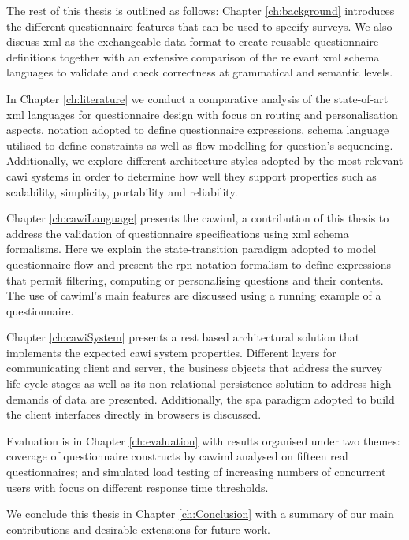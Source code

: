 	The rest of this thesis is outlined as follows: Chapter \ref{ch:background} introduces the different questionnaire features that can be used to specify surveys. We also discuss \gls{xml} as the exchangeable data format to create reusable questionnaire definitions together with an extensive comparison of the relevant \gls{xml} schema languages to validate and check correctness at grammatical and semantic levels.

	In Chapter \ref{ch:literature} we conduct a comparative analysis of the state-of-art \gls{xml} languages for questionnaire design with focus on routing and personalisation aspects, notation adopted to define questionnaire expressions, schema language utilised to define constraints as well as flow modelling for question's sequencing. Additionally, we explore different architecture styles adopted by the most relevant \gls{cawi} systems in order to determine how well they support properties such as scalability, simplicity, portability and reliability.

	Chapter \ref{ch:cawiLanguage} presents the \gls{cawiml}, a contribution of this thesis to address the validation of questionnaire specifications using \gls{xml} schema formalisms. Here we explain the state-transition paradigm adopted to model questionnaire flow and present the \gls{rpn} notation formalism to define expressions that permit filtering, computing or personalising questions and their contents. The use of \gls{cawiml}'s main features are discussed using a running example of a questionnaire.

	Chapter \ref{ch:cawiSystem} presents a \gls{rest} based architectural solution that implements the expected \gls{cawi} system properties. Different layers for communicating client and server, the business objects that address the survey life-cycle stages as well as its non-relational persistence solution to address high demands of data are presented. Additionally, the \gls{spa} paradigm adopted to build the client interfaces directly in browsers is discussed.

	Evaluation is in Chapter \ref{ch:evaluation} with results organised under two themes: coverage of questionnaire constructs by \gls{cawiml} analysed on fifteen real questionnaires; and simulated load testing of increasing numbers of concurrent users with focus on different response time thresholds.

	We conclude this thesis in Chapter \ref{ch:Conclusion} with a summary of our main contributions and desirable extensions for future work.